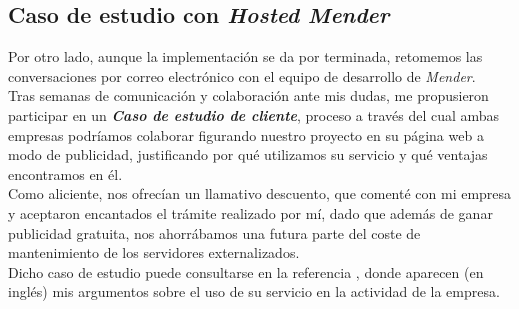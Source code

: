 \subsection{Caso de estudio con \textit{Hosted Mender}}

Por otro lado, aunque la implementación se da por terminada, retomemos las conversaciones por correo electrónico con el equipo de desarrollo de \textit{Mender}.\\

Tras semanas de comunicación y colaboración ante mis dudas, me propusieron participar en un \textbf{\textit{Caso de estudio de cliente}}, proceso a través del cual ambas empresas podríamos colaborar figurando nuestro proyecto en su página web a modo de publicidad, justificando por qué utilizamos su servicio y qué ventajas encontramos en él.\\

Como aliciente, nos ofrecían un llamativo descuento, que comenté con mi empresa y aceptaron encantados el trámite realizado por mí, dado que además de ganar publicidad gratuita, nos ahorrábamos una futura parte del coste de mantenimiento de los servidores externalizados.\\

Dicho caso de estudio puede consultarse en la referencia \cite{customer-case-study}, donde aparecen (en inglés) mis argumentos sobre el uso de su servicio en la actividad de la empresa.

\newpage
